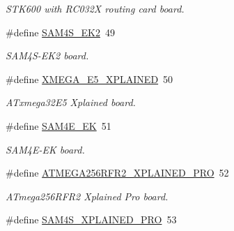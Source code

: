 \begin{DoxyCompactItemize}
\begin{DoxyCompactList}\small\item\em S\+T\+K600 with R\+C032\+X routing card board. \end{DoxyCompactList}\item 
\hypertarget{group__group__common__boards_ga588503ce59af4ecd9eb92c589ce36f57}{}\#define \hyperlink{group__group__common__boards_ga588503ce59af4ecd9eb92c589ce36f57}{S\+A\+M4\+S\+\_\+\+E\+K2}~49\label{group__group__common__boards_ga588503ce59af4ecd9eb92c589ce36f57}

\begin{DoxyCompactList}\small\item\em S\+A\+M4\+S-\/\+E\+K2 board. \end{DoxyCompactList}\item 
\hypertarget{group__group__common__boards_ga6f44c923ab25a96e4de1f389101fae63}{}\#define \hyperlink{group__group__common__boards_ga6f44c923ab25a96e4de1f389101fae63}{X\+M\+E\+G\+A\+\_\+\+E5\+\_\+\+X\+P\+L\+A\+I\+N\+E\+D}~50\label{group__group__common__boards_ga6f44c923ab25a96e4de1f389101fae63}

\begin{DoxyCompactList}\small\item\em A\+Txmega32\+E5 Xplained board. \end{DoxyCompactList}\item 
\hypertarget{group__group__common__boards_ga98d89841c87da3d8358691862e51d814}{}\#define \hyperlink{group__group__common__boards_ga98d89841c87da3d8358691862e51d814}{S\+A\+M4\+E\+\_\+\+E\+K}~51\label{group__group__common__boards_ga98d89841c87da3d8358691862e51d814}

\begin{DoxyCompactList}\small\item\em S\+A\+M4\+E-\/\+E\+K board. \end{DoxyCompactList}\item 
\hypertarget{group__group__common__boards_ga3e5ed6ddb1fa4224ecf5b36e7cd726aa}{}\#define \hyperlink{group__group__common__boards_ga3e5ed6ddb1fa4224ecf5b36e7cd726aa}{A\+T\+M\+E\+G\+A256\+R\+F\+R2\+\_\+\+X\+P\+L\+A\+I\+N\+E\+D\+\_\+\+P\+R\+O}~52\label{group__group__common__boards_ga3e5ed6ddb1fa4224ecf5b36e7cd726aa}

\begin{DoxyCompactList}\small\item\em A\+Tmega256\+R\+F\+R2 Xplained Pro board. \end{DoxyCompactList}\item 
\hypertarget{group__group__common__boards_ga31908f76cb4f5381f944dde3b97a5321}{}\#define \hyperlink{group__group__common__boards_ga31908f76cb4f5381f944dde3b97a5321}{S\+A\+M4\+S\+\_\+\+X\+P\+L\+A\+I\+N\+E\+D\+\_\+\+P\+R\+O}~53\label{group__group__common__boards_ga31908f76cb4f5381f944dde3b97a5321}


\end{DoxyCompactItemize}
